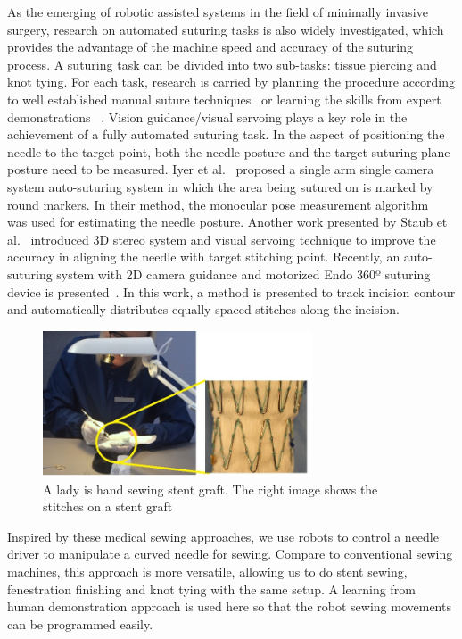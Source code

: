 As the emerging of robotic assisted systems in the field of minimally invasive surgery, research on automated suturing tasks is also widely investigated, which provides the advantage of the machine speed and accuracy of the suturing process. A suturing task can be divided into two sub-tasks: tissue piercing and knot tying. For each task, research is carried by planning the procedure according to well established manual suture techniques~\cite{jackson2013needle,kapoor2008constrained, nageotte2005circular} or learning the skills from expert demonstrations ~\cite{padoy2011human, mayer2008system, van2010superhuman}. Vision guidance/visual servoing plays a key role in the achievement of a fully automated suturing task. In the aspect of positioning the needle to the target point, both the needle posture and the target suturing plane posture need to be measured. Iyer et al.~\cite{iyer2013single} proposed a single arm single camera system auto-suturing system in which the area being sutured on is marked by round markers. In their method, the monocular pose measurement algorithm ~\cite{lo2002trip} was used for estimating the needle posture. Another work presented by Staub et al.~\cite{staub2010automation} introduced 3D stereo system and visual servoing technique to improve the accuracy in aligning the needle with target stitching point. Recently, an auto-suturing system with 2D camera guidance and motorized Endo 360º suturing device is presented~\cite{leonard2014smart}. In this work, a method is presented to track incision contour and automatically distributes equally-spaced stitches along the incision.


\begin{figure}
\centering
{
\includegraphics[width=8cm]{./fig/sewinglady.jpg}
\caption{A lady is hand sewing stent graft. The right image shows the stitches on a stent graft}
\label{fig:sewinglady}}
\end{figure}
Inspired by these medical sewing approaches, we use robots to control a needle driver to manipulate a curved needle for sewing. Compare to conventional sewing machines, this approach is more versatile, allowing us to do stent sewing, fenestration finishing and knot tying with the same setup. A learning from human demonstration approach is used here so that the robot sewing movements can be programmed easily.

